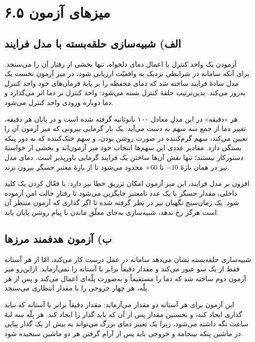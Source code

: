 \documentclass[12pt,a4paper]{article}
\begin{document}

	\section*{۶.۵ میزهای آزمون}
	\subsection*{الف) شبیه‌سازی حلقه‌بسته با مدل فرایند}
	آزمودن یک واحد کنترل با اعمال دمای دلخواه، تنها بخشی از رفتار آن را می‌سنجد. برای آنکه سامانه در شرایطی نزدیک به واقعیّت ارزیابی شود، در میز آزمون نخست یک مدل سادهٔ فرایند ساخته شد که دمای محفظه را بر پایهٔ فرمان‌های خود واحد کنترل به‌روز می‌کند. بدین‌ترتیب حلقهٔ کنترل بسته می‌شود: واحد کنترل بر دما اثر می‌گذارد و دما دوباره ورودی واحد کنترل می‌شود.

	هر «دقیقه» در این مدل معادل ۱۰۰ نانوثانیه گرفته شده است و در پایان هر دقیقه، تغییر دما از جمع سه سهم به دست می‌آید: یک بار گرمایی بیرونی که میز آزمون آن را تعیین می‌کند، سهم گرم‌کننده در صورت روشن بودن، و سهم خنک‌کننده که به دور پنکه بستگی دارد. مقادیر عددی این سهم‌ها انتخاب خود میز آزمون‌اند و بخشی از خواستهٔ دستورکار نیستند؛ تنها نقش آن‌ها ساختن یک فرایند گرمایی باورپذیر است. دمای مدل نیز در همان بازهٔ \(-10\) تا \(+60\) محدود می‌شود تا از بازهٔ معتبر حسگر بیرون نزند.

	افزون بر مدل فرایند، این میز آزمون امکان تزریق خطا نیز دارد: با فعّال کردن یک کلید داخلی، مقدار حسگر با یک عدد نامعتبر جایگزین می‌شود تا رفتار حالت امن آزموده شود. یک زمان‌سنج نگهبان نیز در نظر گرفته شده تا اگر گذاری که آزمون منتظر آن است هرگز رخ ندهد، شبیه‌سازی به‌جای معلّق ماندن با پیام روشن پایان یابد.


	\subsection*{ب) آزمون هدفمند مرزها}
	شبیه‌سازی حلقه‌بسته نشان می‌دهد سامانه در عمل درست کار می‌کند، امّا از هر آستانه فقط از یک سو عبور می‌کند و مقدار دقیقاً برابر با آستانه را نمی‌آزماید. ازاین‌رو میز آزمون دوم ساخته شد که دما را مستقیماً و به‌صورت پلّه‌ای اعمال می‌کند و پس از هر پلّه، هر چهار خروجی را با مقدار انتظاری می‌سنجد.

	این آزمون برای هر آستانه دو مقدار می‌آزماید: مقدار دقیقاً برابر با آستانه که نباید گذاری ایجاد کند، و نخستین مقدار پس از آن که باید گذار را ایجاد کند. هر پلّه سه لبهٔ ساعت نگه داشته می‌شود، زیرا یک تغییر دمای بزرگ می‌تواند به بیش از یک گذار پیاپی در ماشین پنکه بینجامد و خروجی باید پس از آرام گرفتن هر دو ماشین سنجیده شود.
\end{document}
